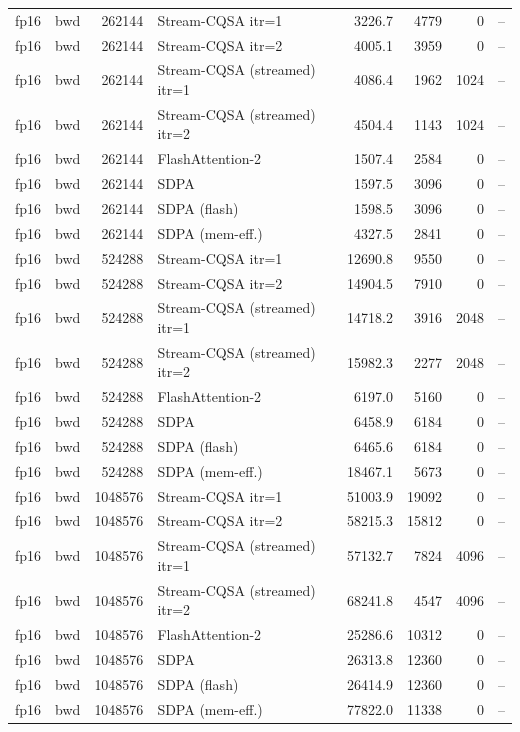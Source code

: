 \begin{tabular}{llrlrrrl}
fp16 & bwd & 262144 & Stream-CQSA itr=1 & 3226.7 & 4779 & 0 & -- \\
fp16 & bwd & 262144 & Stream-CQSA itr=2 & 4005.1 & 3959 & 0 & -- \\
fp16 & bwd & 262144 & Stream-CQSA (streamed) itr=1 & 4086.4 & 1962 & 1024 & -- \\
fp16 & bwd & 262144 & Stream-CQSA (streamed) itr=2 & 4504.4 & 1143 & 1024 & -- \\
fp16 & bwd & 262144 & FlashAttention-2 & 1507.4 & 2584 & 0 & -- \\
fp16 & bwd & 262144 & SDPA & 1597.5 & 3096 & 0 & -- \\
fp16 & bwd & 262144 & SDPA (flash) & 1598.5 & 3096 & 0 & -- \\
fp16 & bwd & 262144 & SDPA (mem-eff.) & 4327.5 & 2841 & 0 & -- \\
fp16 & bwd & 524288 & Stream-CQSA itr=1 & 12690.8 & 9550 & 0 & -- \\
fp16 & bwd & 524288 & Stream-CQSA itr=2 & 14904.5 & 7910 & 0 & -- \\
fp16 & bwd & 524288 & Stream-CQSA (streamed) itr=1 & 14718.2 & 3916 & 2048 & -- \\
fp16 & bwd & 524288 & Stream-CQSA (streamed) itr=2 & 15982.3 & 2277 & 2048 & -- \\
fp16 & bwd & 524288 & FlashAttention-2 & 6197.0 & 5160 & 0 & -- \\
fp16 & bwd & 524288 & SDPA & 6458.9 & 6184 & 0 & -- \\
fp16 & bwd & 524288 & SDPA (flash) & 6465.6 & 6184 & 0 & -- \\
fp16 & bwd & 524288 & SDPA (mem-eff.) & 18467.1 & 5673 & 0 & -- \\
fp16 & bwd & 1048576 & Stream-CQSA itr=1 & 51003.9 & 19092 & 0 & -- \\
fp16 & bwd & 1048576 & Stream-CQSA itr=2 & 58215.3 & 15812 & 0 & -- \\
fp16 & bwd & 1048576 & Stream-CQSA (streamed) itr=1 & 57132.7 & 7824 & 4096 & -- \\
fp16 & bwd & 1048576 & Stream-CQSA (streamed) itr=2 & 68241.8 & 4547 & 4096 & -- \\
fp16 & bwd & 1048576 & FlashAttention-2 & 25286.6 & 10312 & 0 & -- \\
fp16 & bwd & 1048576 & SDPA & 26313.8 & 12360 & 0 & -- \\
fp16 & bwd & 1048576 & SDPA (flash) & 26414.9 & 12360 & 0 & -- \\
fp16 & bwd & 1048576 & SDPA (mem-eff.) & 77822.0 & 11338 & 0 & -- \\

\end{tabular}
